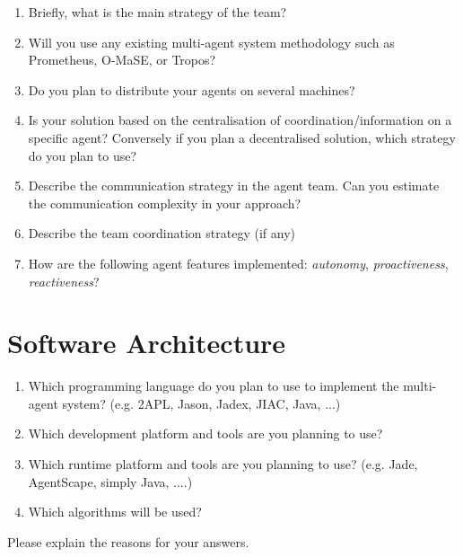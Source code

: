 \documentclass{llncs}
\begin{document}
\begin{enumerate}
  \item Briefly, what is the main strategy of the team?
  \item Will you use any existing multi-agent system
  methodology such as Prometheus, O-MaSE, or Tropos?
 \item Do you plan to distribute your agents on several machines?
 \item Is your solution based on the centralisation of
   coordination/information on a specific agent? Conversely if you
   plan a decentralised solution, which strategy do you plan to use?
\item Describe the communication strategy in the agent team. Can you
   estimate the communication complexity in your approach?
 \item Describe the team coordination strategy (if any)
 \item How are the following agent features implemented:
   \emph{autonomy}, \emph{proactiveness}, \emph{reactiveness}?
\end{enumerate}


\section*{Software Architecture}

\begin{enumerate}
\item Which programming language do you plan to use to implement the
  multi-agent system? (e.g. 2APL, Jason, Jadex, JIAC, Java, ...)
\item Which development platform and tools are you planning to use?
\item Which runtime platform and tools are you planning to use?
  (e.g. Jade, AgentScape, simply Java, ....)
\item Which algorithms will be used?
\end{enumerate}
Please explain the reasons for your answers.

\end{document}
